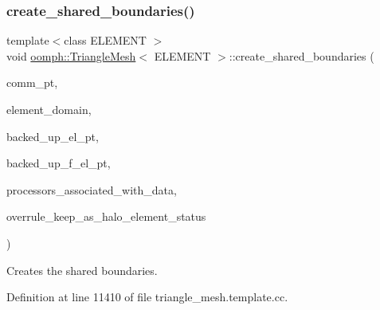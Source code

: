 \subsubsection{\texorpdfstring{create\+\_\+shared\+\_\+boundaries()}{create\_shared\_boundaries()}}
{\footnotesize\ttfamily template$<$class E\+L\+E\+M\+E\+NT $>$ \\
void \hyperlink{classoomph_1_1TriangleMesh}{oomph\+::\+Triangle\+Mesh}$<$ E\+L\+E\+M\+E\+NT $>$\+::create\+\_\+shared\+\_\+boundaries (\begin{DoxyParamCaption}\item[{Oomph\+Communicator $\ast$}]{comm\+\_\+pt,  }\item[{const Vector$<$ unsigned $>$ \&}]{element\+\_\+domain,  }\item[{const Vector$<$ Generalised\+Element $\ast$$>$ \&}]{backed\+\_\+up\+\_\+el\+\_\+pt,  }\item[{const Vector$<$ Finite\+Element $\ast$$>$ \&}]{backed\+\_\+up\+\_\+f\+\_\+el\+\_\+pt,  }\item[{std\+::map$<$ Data $\ast$, std\+::set$<$ unsigned $>$ $>$ \&}]{processors\+\_\+associated\+\_\+with\+\_\+data,  }\item[{const bool \&}]{overrule\+\_\+keep\+\_\+as\+\_\+halo\+\_\+element\+\_\+status }\end{DoxyParamCaption})\hspace{0.3cm}{\ttfamily [protected]}}



Creates the shared boundaries. 



Definition at line 11410 of file triangle\+\_\+mesh.\+template.\+cc.

\mbox{\label{classoomph_1_1TriangleMesh_ac59a791cf11147bc54b17a12a35e9707}} 
